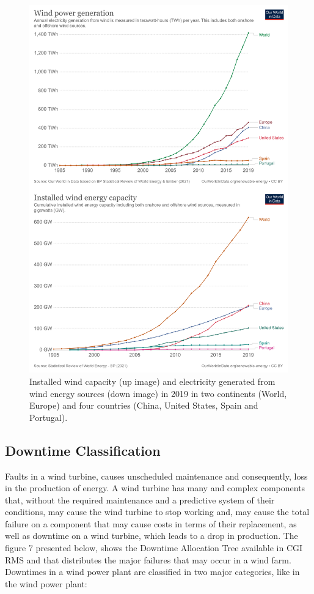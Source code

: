 \begin{figure}[htbp]
	\centering
	\includegraphics[width=\textwidth]{Chapters/Figures/background_fig6.PNG}
	\caption{Installed wind capacity (up image) and electricity generated from wind energy sources (down image) in 2019 in two continents (World, Europe) and four countries (China, United States, Spain and Portugal). \cite{OLD_33_GENERAL} }
	\label{fig:Figuras_Tree_silhouettes-vectorial}
\end{figure}


\subsection{Downtime Classification} 
\label{sub:if_you_use_this_template} 

Faults in a wind turbine, causes unscheduled maintenance and consequently, loss in the production of energy. A wind turbine has many and complex components that, without the required maintenance and a predictive system of their conditions, may cause the wind turbine to stop working and, may cause the total failure on a component that may cause costs in terms of their replacement, as well as downtime on a wind turbine, which leads to a drop in production.
The figure 7 presented below, shows the Downtime Allocation Tree available in CGI RMS and that distributes the major failures that may occur in a wind farm. Downtimes in a wind power plant are classified in two major categories, like in the wind power plant:

